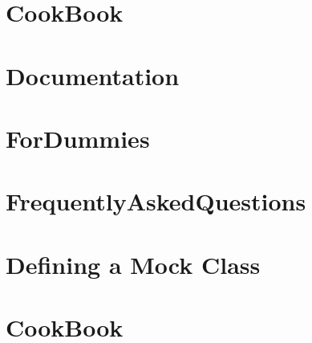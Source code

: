 \documentclass[twoside]{book}
\newcommand{\+}{\discretionary{\mbox{\scriptsize$\hookleftarrow$}}{}{}}
\begin{document}
\chapter{Cook\+Book}
\label{md__home_bhargavi_Documents_SDR_Copy_Exam_808X_vendor_googletest_googlemock_docs_v1_5_CookBook}
\hypertarget{md__home_bhargavi_Documents_SDR_Copy_Exam_808X_vendor_googletest_googlemock_docs_v1_5_CookBook}{}

\chapter{Documentation}
\label{md__home_bhargavi_Documents_SDR_Copy_Exam_808X_vendor_googletest_googlemock_docs_v1_5_Documentation}
\hypertarget{md__home_bhargavi_Documents_SDR_Copy_Exam_808X_vendor_googletest_googlemock_docs_v1_5_Documentation}{}

\chapter{For\+Dummies}
\label{md__home_bhargavi_Documents_SDR_Copy_Exam_808X_vendor_googletest_googlemock_docs_v1_5_ForDummies}
\hypertarget{md__home_bhargavi_Documents_SDR_Copy_Exam_808X_vendor_googletest_googlemock_docs_v1_5_ForDummies}{}

\chapter{Frequently\+Asked\+Questions}
\label{md__home_bhargavi_Documents_SDR_Copy_Exam_808X_vendor_googletest_googlemock_docs_v1_5_FrequentlyAskedQuestions}
\hypertarget{md__home_bhargavi_Documents_SDR_Copy_Exam_808X_vendor_googletest_googlemock_docs_v1_5_FrequentlyAskedQuestions}{}

\chapter{Defining a Mock Class}
\label{md__home_bhargavi_Documents_SDR_Copy_Exam_808X_vendor_googletest_googlemock_docs_v1_6_CheatSheet}
\hypertarget{md__home_bhargavi_Documents_SDR_Copy_Exam_808X_vendor_googletest_googlemock_docs_v1_6_CheatSheet}{}

\chapter{Cook\+Book}
\label{md__home_bhargavi_Documents_SDR_Copy_Exam_808X_vendor_googletest_googlemock_docs_v1_6_CookBook}
\hypertarget{md__home_bhargavi_Documents_SDR_Copy_Exam_808X_vendor_googletest_googlemock_docs_v1_6_CookBook}{}

\end{document}
